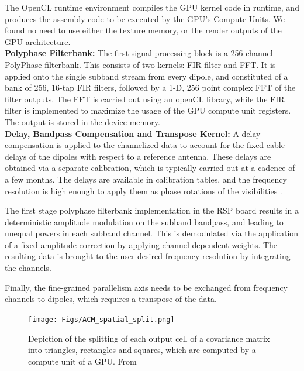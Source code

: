 \documentclass{ws-jai}
\begin{document}
The OpenCL  runtime environment  compiles the  GPU kernel  code in  runtime, and
produces the assembly code  to be executed by the GPU's  Compute Units. We found
no need  to use  either the  texture memory, or  the render  outputs of  the GPU
architecture.\\


\noindent \textbf {Polyphase Filterbank:} The first signal processing block is a
256 channel PolyPhase  filterbank. This consists of two kernels:  FIR filter and
FFT.   It is  applied onto  the  single subband  stream from  every dipole,  and
constituted of a bank  of 256, 16-tap FIR filters, followed by  a 1-D, 256 point
complex FFT  of the  filter outputs.   The FFT  is carried  out using  an openCL
library, while the  FIR filter is implemented  to maximize the usage  of the GPU
compute unit registers. The output is stored in the device memory.\\

\noindent \textbf {Delay,  Bandpass Compensation and Transpose  Kernel:} A delay
compensation is applied  to the channelized data to account  for the fixed cable
delays of  the dipoles with  respect to a  reference antenna.  These  delays are
obtained via a separate calibration, which is typically carried out at a cadence
of  a few  months.  The  delays  are available  in calibration  tables, and  the
frequency resolution  is high  enough to  apply them as  phase rotations  of the
visibilities \cite {zatman1998narrow}.

The first stage polyphase filterbank implementation  in the RSP board results in
a deterministic  amplitude modulation  on the subband  bandpass, and  leading to
unequal powers in each subband channel.  This is demodulated via the application
of  a fixed  amplitude correction  by applying  channel-dependent weights.   The
resulting  data  is  brought  to   the  user  desired  frequency  resolution  by
integrating the channels.

Finally, the  fine-grained parallelism axis  needs to be exchanged  from frequency
channels to dipoles, which requires a transpose of the data.

\begin{figure}[htbp]
\centering
\texttt{[image: Figs/ACM\_spatial\_split.png]}
\caption {Depiction of the splitting of  each output cell of a covariance matrix
  into triangles, rectangles  and squares, which are computed by  a compute unit
  of a GPU. From \cite{romein2016comparison}}
\label{fig:acm_spatial_split}
\end{figure}
\end{document}

